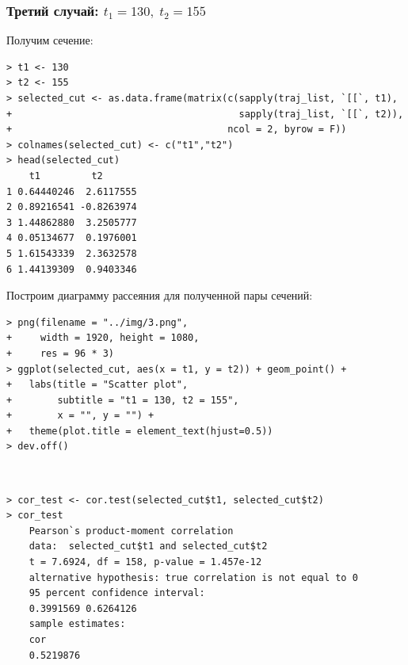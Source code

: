\documentclass[14pt,a4paper]{scrartcl}
\begin{document}
\subsubsection*{Третий случай: $t_1 = 130, \; t_2 = 155$}
Получим сечение:

\begin{verbatim}
> t1 <- 130
> t2 <- 155
> selected_cut <- as.data.frame(matrix(c(sapply(traj_list, `[[`, t1),
+                                        sapply(traj_list, `[[`, t2)),
+                                      ncol = 2, byrow = F))
> colnames(selected_cut) <- c("t1","t2")
> head(selected_cut)
	t1         t2
1 0.64440246  2.6117555
2 0.89216541 -0.8263974
3 1.44862880  3.2505777
4 0.05134677  0.1976001
5 1.61543339  2.3632578
6 1.44139309  0.9403346
\end{verbatim}

Построим диаграмму рассеяния для полученной пары сечений:

\begin{verbatim}
> png(filename = "../img/3.png",
+     width = 1920, height = 1080,
+     res = 96 * 3)
> ggplot(selected_cut, aes(x = t1, y = t2)) + geom_point() +
+   labs(title = "Scatter plot",
+        subtitle = "t1 = 130, t2 = 155",
+        x = "", y = "") + 
+   theme(plot.title = element_text(hjust=0.5))
> dev.off()
\end{verbatim}

\begin{figure}[H]
	\begin{minipage}[h]{1\linewidth}
		  \\
	\end{minipage}
\end{figure}


\begin{verbatim}
> cor_test <- cor.test(selected_cut$t1, selected_cut$t2)
> cor_test
	Pearson`s product-moment correlation
	data:  selected_cut$t1 and selected_cut$t2
	t = 7.6924, df = 158, p-value = 1.457e-12
	alternative hypothesis: true correlation is not equal to 0
	95 percent confidence interval:
	0.3991569 0.6264126
	sample estimates:
	cor 
	0.5219876 
\end{verbatim}
\end{document}
